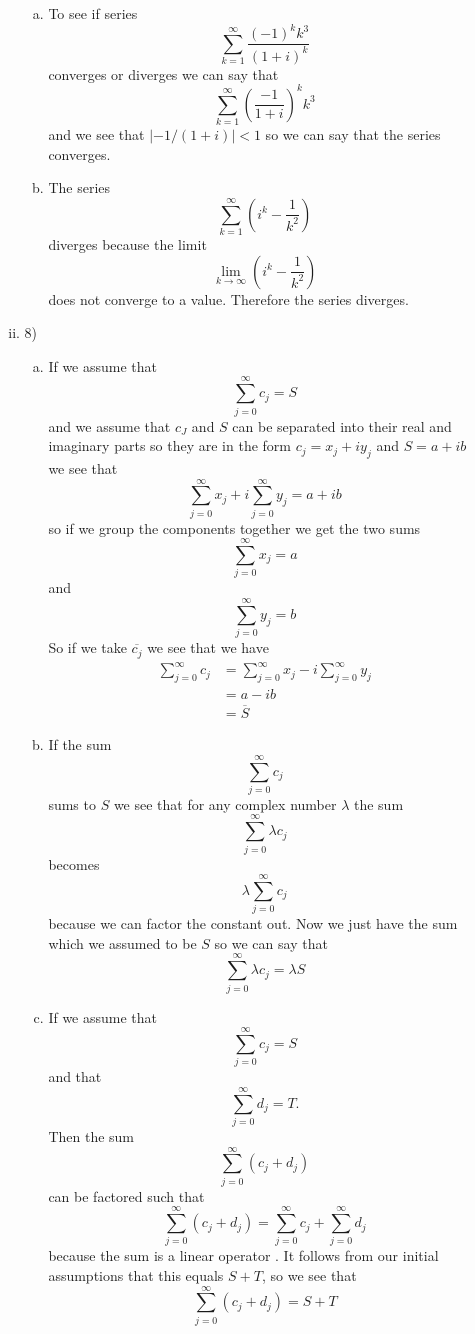 \documentclass[11pt]{article}
\begin{document}
\begin{enumerate}
\begin{enumerate}[(i)]
\begin{enumerate}[(a)]
\item
To see if series
$$\sum_{k=1}^{\infty}\frac{(-1)^kk^3}{(1+i)^k}$$
converges or diverges we can say that 
$$\sum_{k=1}^{\infty}\left(\frac{-1}{1+i}\right)^kk^3$$
and we see that $|-1/(1+i)|<1$ so we can say that the series converges.

\item
The series
$$\sum_{k=1}^{\infty}\left(i^k-\frac{1}{k^2}\right)$$
diverges because the limit 
$$\lim_{k\rightarrow\infty}\left(i^k-\frac{1}{k^2}\right)$$
does not converge to a value. Therefore the series diverges.

\end{enumerate}

\item 8)
\begin{enumerate}[(a)]
\item
If we assume that
$$\sum_{j=0}^{\infty}c_j = S$$
and we assume that $c_J$ and $S$ can be separated into their real and imaginary parts so they are in the form $c_j = x_j+iy_j$ and $S = a+ib$ we see that
$$\sum_{j=0}^{\infty}x_j + i\sum_{j=0}^{\infty}y_j = a+ib$$
so if we group the components together we get the two sums
$$\sum_{j=0}^{\infty}x_j = a$$
and
$$\sum_{j=0}^{\infty}y_j = b$$
So if we take $\overline{c_j}$ we see that we have
\begin{align*}
\sum_{j=0}^{\infty}c_j &= \sum_{j=0}^{\infty}x_j - i\sum_{j=0}^{\infty}y_j\\
&= a - ib\\
&= \overline{S}
\end{align*}

\item
If the sum
$$\sum_{j=0}^{\infty}c_j$$
sums to $S$ we see that for any complex number $\lambda$ the sum
$$\sum_{j=0}^{\infty}\lambda c_j$$
becomes
$$\lambda\sum_{j=0}^{\infty} c_j$$
because we can factor the constant out. Now we just have the sum which we assumed to be $S$ so we can say that
$$\sum_{j=0}^{\infty}\lambda c_j=\lambda S$$
\item
If we assume that
$$\sum_{j=0}^{\infty}c_j=S$$
and that
$$\sum_{j=0}^{\infty}d_j=T.$$
Then the sum
$$\sum_{j=0}^{\infty}\left(c_j+d_j\right)$$
can be factored such that 
$$\sum_{j=0}^{\infty}\left(c_j+d_j\right) = \sum_{j=0}^{\infty}c_j + \sum_{j=0}^{\infty}d_j$$
because the sum is a linear operator . It follows from our initial assumptions that this equals $S+T$, so we see that
$$\sum_{j=0}^{\infty}\left(c_j+d_j\right)=S+T$$
\end{enumerate}


\end{enumerate}
\end{enumerate}
\end{document}
